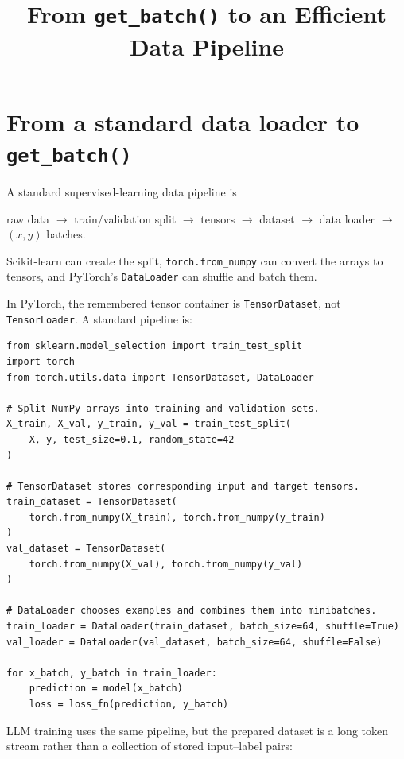 \documentclass[11pt]{article}
\title{From \texttt{get\_batch()} to an Efficient Data Pipeline}
\author{}
\date{}
\begin{document}
\maketitle
\tableofcontents
\newpage

\section{From a standard data loader to \texttt{get\_batch()}}

A standard supervised-learning data pipeline is

\begin{center}
raw data $\longrightarrow$ train/validation split
$\longrightarrow$ tensors $\longrightarrow$ dataset
$\longrightarrow$ data loader $\longrightarrow$ $(x,y)$ batches.
\end{center}

Scikit-learn can create the split, \texttt{torch.from\_numpy} can convert the
arrays to tensors, and PyTorch's \texttt{DataLoader} can shuffle and batch
them.

In PyTorch, the remembered tensor container is \texttt{TensorDataset}, not
\texttt{TensorLoader}. A standard pipeline is:

\begin{lstlisting}[basicstyle=\ttfamily\footnotesize]
from sklearn.model_selection import train_test_split
import torch
from torch.utils.data import TensorDataset, DataLoader

# Split NumPy arrays into training and validation sets.
X_train, X_val, y_train, y_val = train_test_split(
    X, y, test_size=0.1, random_state=42
)

# TensorDataset stores corresponding input and target tensors.
train_dataset = TensorDataset(
    torch.from_numpy(X_train), torch.from_numpy(y_train)
)
val_dataset = TensorDataset(
    torch.from_numpy(X_val), torch.from_numpy(y_val)
)

# DataLoader chooses examples and combines them into minibatches.
train_loader = DataLoader(train_dataset, batch_size=64, shuffle=True)
val_loader = DataLoader(val_dataset, batch_size=64, shuffle=False)

for x_batch, y_batch in train_loader:
    prediction = model(x_batch)
    loss = loss_fn(prediction, y_batch)
\end{lstlisting}

LLM training uses the same pipeline, but the prepared dataset is a long token
stream rather than a collection of stored input--label pairs:
\end{document}
